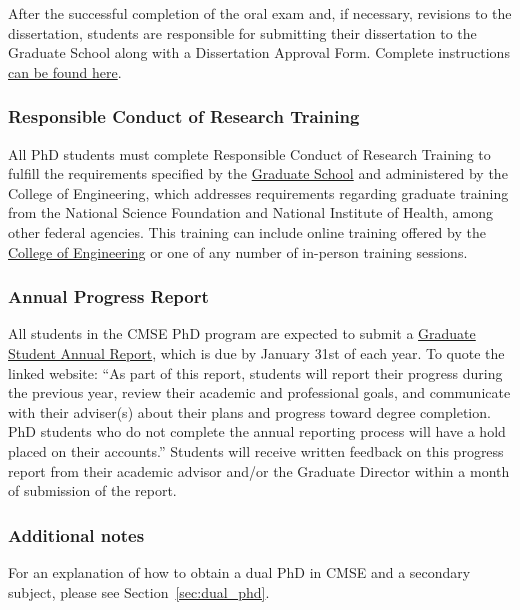 \noindent
After the successful completion of the oral exam and, if necessary,
revisions to the dissertation, students are responsible for submitting
their dissertation to the Graduate School along with a Dissertation
Approval Form.  Complete
instructions \href{https://grad.msu.edu/etd}{can be found here}.




\vspace{3mm}
\subsubsection{Responsible Conduct of Research Training}
\label{sec:rcr}

All PhD students must complete Responsible Conduct of Research
Training to fulfill the requirements specified by the \href{http://grad.msu.edu/rcr/}{Graduate
School} and administered by the College of Engineering, which addresses requirements regarding
graduate training from the National Science Foundation and National
Institute of Health, among other federal agencies.  This training can
include online training offered by the \href{https://www.egr.msu.edu/secureresearchcourses/}{College of
Engineering}  or one of
any number of in-person training sessions.

\vspace{3mm}
\subsubsection{Annual Progress Report}

All students in the CMSE PhD program are expected to submit a
\href{https://www.egr.msu.edu/academics/graduate/graduate-student-annual-reporting-requirements}{Graduate
  Student Annual Report}, which is due by January 31st of each year.
To quote the linked website:  ``As part of this report, students will
report their progress during the previous year, review their academic
and professional goals, and communicate with their adviser(s) about
their plans and progress toward degree completion. PhD students who do
not complete the annual reporting process will have a hold placed on
their accounts.''  Students will receive written feedback on this progress
report from their academic advisor and/or the Graduate Director within
a month of submission of the report.

\vspace{3mm}
\subsubsection{Additional notes}

For an explanation of how to obtain a dual PhD in CMSE and a secondary
subject, please see Section~\ref{sec:dual_phd}.




